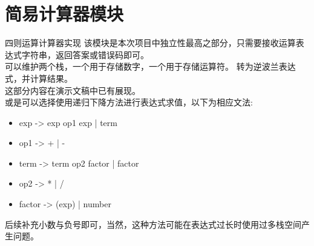 \documentclass[10pt]{beamer}
\begin{document}
\section{简易计算器模块}

\begin{frame}{四则运算计算器实现}
    该模块是本次项目中独立性最高之部分，只需要接收运算表达式字符串，返回答案或错误码即可。\\
    可以维护两个栈，一个用于存储数字，一个用于存储运算符。
    转为逆波兰表达式，并计算结果。\\
    这部分内容在演示文稿中已有展现。\\
    或是可以选择使用递归下降方法进行表达式求值，以下为相应文法:\\
    \begin{itemize}
        \item exp -> exp op1 exp | term
        \item op1 -> + | -
        \item term -> term op2 factor | factor
        \item op2 -> * | /
        \item factor -> (exp) | number
    \end{itemize}
    后续补充小数与负号即可，当然，这种方法可能在表达式过长时使用过多栈空间产生问题。\\
\end{frame}
\end{document}
